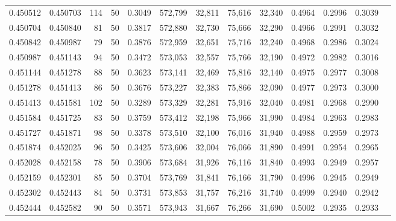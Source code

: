 \begin{tabular}{rrrrrrrrrrrrr}
0.450512 & 0.450703 &   114 &  50 &                                     0.3049 & 572,799 &  32,811 &  75,616 &  32,340 & 0.4964 & 0.2996 & 0.3039 \\
0.450704 & 0.450840 &    81 &  50 &                                     0.3817 & 572,880 &  32,730 &  75,666 &  32,290 & 0.4966 & 0.2991 & 0.3032 \\
0.450842 & 0.450987 &    79 &  50 &                                     0.3876 & 572,959 &  32,651 &  75,716 &  32,240 & 0.4968 & 0.2986 & 0.3024 \\
0.450987 & 0.451143 &    94 &  50 &                                     0.3472 & 573,053 &  32,557 &  75,766 &  32,190 & 0.4972 & 0.2982 & 0.3016 \\
0.451144 & 0.451278 &    88 &  50 &                                     0.3623 & 573,141 &  32,469 &  75,816 &  32,140 & 0.4975 & 0.2977 & 0.3008 \\
0.451278 & 0.451413 &    86 &  50 &                                     0.3676 & 573,227 &  32,383 &  75,866 &  32,090 & 0.4977 & 0.2973 & 0.3000 \\
0.451413 & 0.451581 &   102 &  50 &                                     0.3289 & 573,329 &  32,281 &  75,916 &  32,040 & 0.4981 & 0.2968 & 0.2990 \\
0.451584 & 0.451725 &    83 &  50 &                                     0.3759 & 573,412 &  32,198 &  75,966 &  31,990 & 0.4984 & 0.2963 & 0.2983 \\
0.451727 & 0.451871 &    98 &  50 &                                     0.3378 & 573,510 &  32,100 &  76,016 &  31,940 & 0.4988 & 0.2959 & 0.2973 \\
0.451874 & 0.452025 &    96 &  50 &                                     0.3425 & 573,606 &  32,004 &  76,066 &  31,890 & 0.4991 & 0.2954 & 0.2965 \\
0.452028 & 0.452158 &    78 &  50 &                                     0.3906 & 573,684 &  31,926 &  76,116 &  31,840 & 0.4993 & 0.2949 & 0.2957 \\
0.452159 & 0.452301 &    85 &  50 &                                     0.3704 & 573,769 &  31,841 &  76,166 &  31,790 & 0.4996 & 0.2945 & 0.2949 \\
0.452302 & 0.452443 &    84 &  50 &                                     0.3731 & 573,853 &  31,757 &  76,216 &  31,740 & 0.4999 & 0.2940 & 0.2942 \\
0.452444 & 0.452582 &    90 &  50 &                                     0.3571 & 573,943 &  31,667 &  76,266 &  31,690 & 0.5002 & 0.2935 & 0.2933 \\

\end{tabular}

